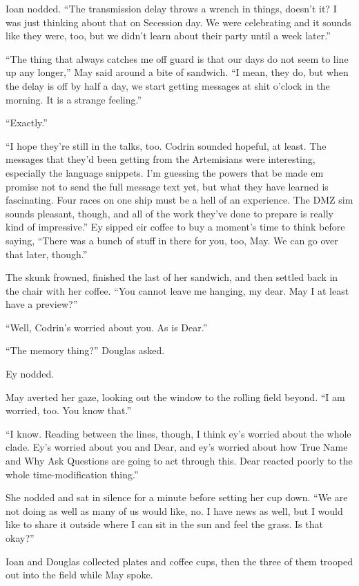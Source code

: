 Ioan nodded. ``The transmission delay throws a wrench in things, doesn't it? I was just thinking about that on Secession day. We were celebrating and it sounds like they were, too, but we didn't learn about their party until a week later.''

``The thing that always catches me off guard is that our days do not seem to line up any longer,'' May said around a bite of sandwich. ``I mean, they do, but when the delay is off by half a day, we start getting messages at shit o'clock in the morning. It is a strange feeling.''

``Exactly.''

``I hope they're still in the talks, too. Codrin sounded hopeful, at least. The messages that they'd been getting from the Artemisians were interesting, especially the language snippets. I'm guessing the powers that be made em promise not to send the full message text yet, but what they have learned is fascinating. Four races on one ship must be a hell of an experience. The DMZ sim sounds pleasant, though, and all of the work they've done to prepare is really kind of impressive.'' Ey sipped eir coffee to buy a moment's time to think before saying, ``There was a bunch of stuff in there for you, too, May. We can go over that later, though.''

The skunk frowned, finished the last of her sandwich, and then settled back in the chair with her coffee. ``You cannot leave me hanging, my dear. May I at least have a preview?''

``Well, Codrin's worried about you. As is Dear.''

``The memory thing?'' Douglas asked.

Ey nodded.

May averted her gaze, looking out the window to the rolling field beyond. ``I am worried, too. You know that.''

``I know. Reading between the lines, though, I think ey's worried about the whole clade. Ey's worried about you and Dear, and ey's worried about how True Name and Why Ask Questions are going to act through this. Dear reacted poorly to the whole time-modification thing.''

She nodded and sat in silence for a minute before setting her cup down. ``We are not doing as well as many of us would like, no. I have news as well, but I would like to share it outside where I can sit in the sun and feel the grass. Is that okay?''

Ioan and Douglas collected plates and coffee cups, then the three of them trooped out into the field while May spoke.


